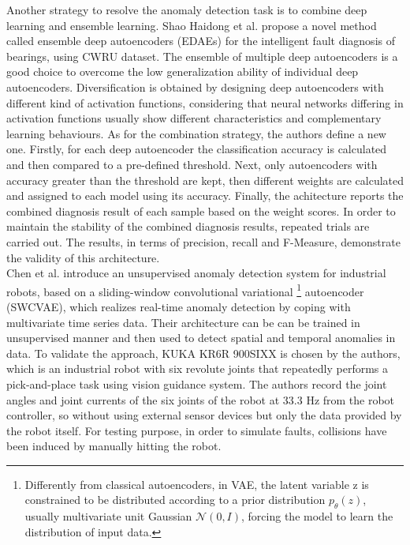 Another strategy to resolve the anomaly detection task is to combine deep learning and ensemble learning. Shao Haidong et al. \cite{14NovelMethodEnsembleDeepAutoencoder} propose a novel method called ensemble deep autoencoders (EDAEs) for the intelligent fault diagnosis of bearings, using CWRU dataset. The ensemble of multiple deep autoencoders is a good choice to overcome the low generalization ability of individual deep autoencoders. Diversification is obtained by designing deep autoencoders with different kind of activation functions, considering that neural networks differing in activation functions usually show different characteristics and complementary learning behaviours. As for the combination strategy, the authors define a new one. Firstly, for each deep autoencoder the classification accuracy is calculated and then compared to a pre-defined threshold. Next, only autoencoders with accuracy greater than the threshold are kept, then different weights are calculated and assigned to each model using its accuracy. Finally, the achitecture reports the combined diagnosis result of each sample based on the weight scores. In order to maintain the stability of the combined diagnosis results, repeated trials are carried out. The results, in terms of precision, recall and F-Measure, demonstrate the validity of this architecture.\\
Chen et al. \cite{21RobotAnomalyDetection} introduce an unsupervised anomaly detection system for industrial robots, based on a sliding-window convolutional variational \footnote{Differently from classical autoencoders, in VAE, the latent variable z is constrained to be distributed according to a prior distribution $p_\theta (z)$, usually multivariate unit Gaussian $\mathcal{N}(0,I)$, forcing the model to learn the distribution of input data.}
autoencoder (SWCVAE), which realizes real-time anomaly detection by coping with multivariate time series data. Their architecture can be can be trained in unsupervised manner and then used to detect spatial and temporal anomalies in data. To validate the approach, KUKA KR6R 900SIXX is chosen by the authors, which is an industrial robot with six revolute joints that repeatedly performs a pick-and-place task using vision guidance system. The authors record the joint angles and joint currents of the six joints of the robot at 33.3 Hz from the robot controller, so without using external sensor devices but only the data provided by the robot itself. For testing purpose, in order to simulate faults, collisions have been induced by manually hitting the robot.

